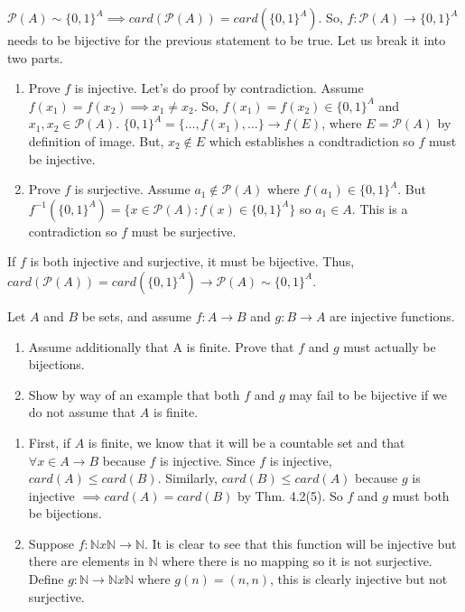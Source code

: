 \documentclass[12pt,letterpaper,boxed]{hmcpset}
\begin{document}
\begin{solution}
$\mathcal{P}(A) \sim \{0,1\}^{A} \implies card(\mathcal{P}(A)) = card(\{0,1\}^{A}).$ So, $f : \mathcal{P}(A) \rightarrow \{0,1\}^{A}$ needs to be bijective for the previous statement to be true. Let us break it into two parts. 
\vspace{-2mm}
\begin{enumerate}
	\itemsep0em
	\item Prove $f$ is injective. Let's do proof by contradiction. Assume $f(x_1)=f(x_2)\implies x_1 \neq x_2.$ So, $f(x_1)=f(x_2)\in\{0,1\}^{A}$ and $x_1, x_2 \in \mathcal{P}(A).$ $\{0,1\}^{A} = \{\dots,f(x_1),\dots\} \rightarrow f(E)$, where $E = \mathcal{P}(A)$ by definition of image. But, $x_2 \notin E$ which establishes a condtradiction so $f$ must be injective.
	\item Prove $f$ is surjective. Assume $a_1 \notin \mathcal{P}(A)$ where $f(a_1) \in \{0,1\}^{A}.$ But $f^{-1}(\{0,1\}^{A}) = \{x\in \mathcal{P}(A) : f(x) \in \{0,1\}^{A} \}$ so $a_1 \in A.$ This is a contradiction so $f$ must be surjective.  
\end{enumerate}
If $f$ is both injective and surjective, it must be bijective. Thus, $card(\mathcal{P}(A)) = card(\{0,1\}^{A}) \rightarrow \mathcal{P}(A) \sim \{0,1\}^{A}.$ 
\end{solution}

\begin{problem}[Exercise 4.17]
Let $A$ and $B$ be sets, and assume $f: A \rightarrow B$ and $g: B \rightarrow A$ are injective functions.
\vspace{-2mm}
\begin{enumerate}
	\itemsep0em
	\item Assume additionally that A is finite. Prove that $f$ and $g$ must actually be bijections.
	\item Show by way of an example that both $f$ and $g$ may fail to be bijective if we do not assume that $A$ is finite.
\end{enumerate}
\end{problem}

\begin{solution}
\begin{enumerate}
	\itemsep0em
	\item First, if $A$ is finite, we know that it will be a countable set and that $\forall x\in A \rightarrow B$ because $f$ is injective. Since $f$ is injective, $card(A)\leq card(B).$ Similarly, $card(B)\leq card(A)$ because $g$ is injective $\implies card(A)=card(B)$ by Thm. 4.2(5). So $f$ and $g$ must both be bijections.
	\item Suppose $f: \mathbb{N}x\mathbb{N}\rightarrow \mathbb{N}$. It is clear to see that this function will be injective but there are elements in $\mathbb{N}$ where there is no mapping so it is not surjective. Define $g: \mathbb{N}\rightarrow \mathbb{N}x\mathbb{N}$ where $g(n)=(n,n)$, this is clearly injective but not surjective.
\end{enumerate}

\end{solution}
\end{document}
